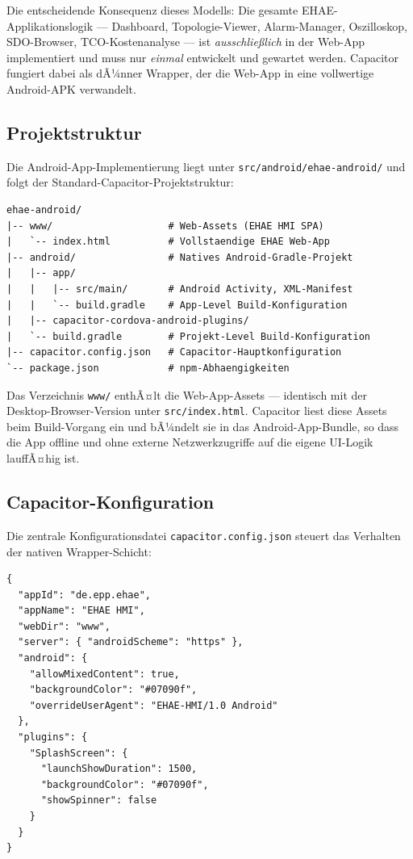 ﻿\documentclass[12pt,a4paper]{article}
\begin{document}
Die entscheidende Konsequenz dieses Modells: Die gesamte EHAE-Applikationslogik
--- Dashboard, Topologie-Viewer, Alarm-Manager, Oszilloskop, SDO-Browser,
TCO-Kostenanalyse --- ist \emph{ausschlie\ss{}lich} in der Web-App implementiert
und muss nur \emph{einmal} entwickelt und gewartet werden. Capacitor fungiert dabei
als dÃ¼nner Wrapper, der die Web-App in eine vollwertige Android-APK verwandelt.

\subsection{Projektstruktur}

Die Android-App-Implementierung liegt unter \texttt{src/android/ehae-android/} und
folgt der Standard-Capacitor-Projektstruktur:

\begin{lstlisting}[language={}, caption={Projektstruktur der EHAE-Android-App.}]
ehae-android/
|-- www/                    # Web-Assets (EHAE HMI SPA)
|   `-- index.html          # Vollstaendige EHAE Web-App
|-- android/                # Natives Android-Gradle-Projekt
|   |-- app/
|   |   |-- src/main/       # Android Activity, XML-Manifest
|   |   `-- build.gradle    # App-Level Build-Konfiguration
|   |-- capacitor-cordova-android-plugins/
|   `-- build.gradle        # Projekt-Level Build-Konfiguration
|-- capacitor.config.json   # Capacitor-Hauptkonfiguration
`-- package.json            # npm-Abhaengigkeiten
\end{lstlisting}

Das Verzeichnis \texttt{www/} enthÃ¤lt die Web-App-Assets --- identisch mit der
Desktop-Browser-Version unter \texttt{src/index.html}. Capacitor liest diese Assets
beim Build-Vorgang ein und bÃ¼ndelt sie in das Android-App-Bundle, so dass die App
offline und ohne externe Netzwerkzugriffe auf die eigene UI-Logik lauffÃ¤hig ist.

\subsection{Capacitor-Konfiguration}

Die zentrale Konfigurationsdatei \texttt{capacitor.config.json} steuert das Verhalten
der nativen Wrapper-Schicht:

\begin{lstlisting}[language={}, caption={Capacitor-Konfiguration (\texttt{capacitor.config.json}).}]
{
  "appId": "de.epp.ehae",
  "appName": "EHAE HMI",
  "webDir": "www",
  "server": { "androidScheme": "https" },
  "android": {
    "allowMixedContent": true,
    "backgroundColor": "#07090f",
    "overrideUserAgent": "EHAE-HMI/1.0 Android"
  },
  "plugins": {
    "SplashScreen": {
      "launchShowDuration": 1500,
      "backgroundColor": "#07090f",
      "showSpinner": false
    }
  }
}
\end{lstlisting}
\end{document}

